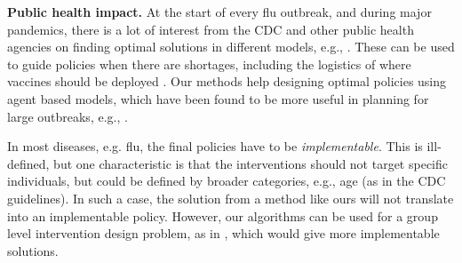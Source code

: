 \noindent
\textbf{Public health impact.}
At the start of every flu outbreak, and during major pandemics, there is a lot of interest from the CDC and other public health agencies on finding optimal solutions in different models, e.g., \cite{medlock:science09,halloran:pnas08,lofgren:pnas14,venkataramanan:ichi17}. These can be used to guide policies when there are shortages, including the logistics of where vaccines should be deployed \cite{venkataramanan:ichi17}. Our methods help designing optimal policies using agent based models, which have been found to be more useful in planning for large outbreaks, e.g., \cite{halloran:pnas08,lofgren:pnas14,eubank:nature04,gk06}.

In most diseases, e.g. flu, the final policies have to be \emph{implementable}. This is ill-defined, but one characteristic is that the interventions should not target specific individuals, but could be defined by broader categories, e.g., age (as in the CDC guidelines). In such a case, the solution from a method like ours will not translate into an implementable policy. However, our algorithms can be used for a group level intervention design problem, as in \cite{zhang2015controlling}, which would give more implementable solutions.

